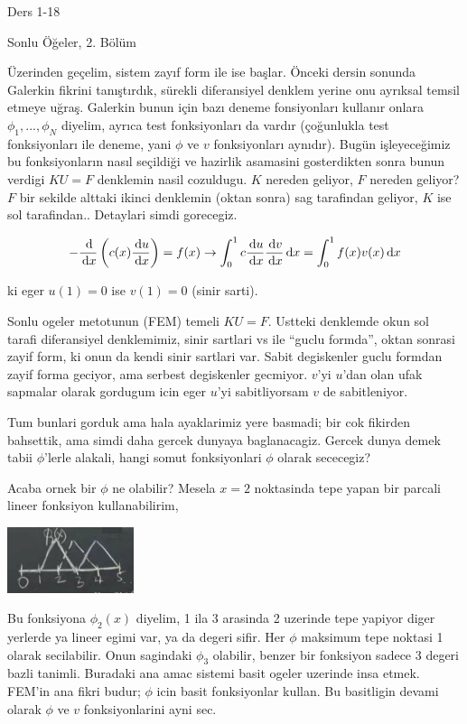\documentclass[12pt,fleqn]{article}\usepackage{../../common}
\begin{document}
Ders 1-18

Sonlu Öğeler, 2. Bölüm

Üzerinden geçelim, sistem zayıf form ile ise başlar. Önceki dersin sonunda
Galerkin fikrini tanıştırdık, sürekli diferansiyel denklem yerine onu ayrıksal
temsil etmeye uğraş. Galerkin bunun için bazı deneme fonsiyonları kullanır
onlara $\phi_1,...,\phi_N$ diyelim, ayrıca test fonksiyonları da vardır
(çoğunlukla test fonksiyonları ile deneme, yani $\phi$ ve $v$ fonksiyonları
aynıdır). Bugün işleyeceğimiz bu fonksiyonların nasıl seçildiği ve hazirlik
asamasini gosterdikten sonra bunun verdigi $KU = F$ denklemin nasil
cozuldugu. $K$ nereden geliyor, $F$ nereden geliyor? $F$ bir sekilde alttaki
ikinci denklemin (oktan sonra) sag tarafindan geliyor, $K$ ise sol
tarafindan.. Detaylari simdi gorecegiz.

$$
- \frac{\,\mathrm{d}}{\,\mathrm{d} x} \left( c(x) \frac{\,\mathrm{d} u}{\,\mathrm{d} x} \right) = f(x) \to
\int _{0}^{1} c \frac{\,\mathrm{d} u}{\,\mathrm{d} x} \frac{\,\mathrm{d} v}{\,\mathrm{d} x} \,\mathrm{d} x =
\int _{0}^{1} f(x) v(x) \,\mathrm{d} x
$$

ki eger $u(1)=0$ ise $v(1) = 0$ (sinir sarti).

Sonlu ogeler metotunun (FEM) temeli $KU = F$. Ustteki denklemde okun sol tarafi
diferansiyel denklemimiz, sinir sartlari vs ile ``guclu formda'', oktan sonrasi
zayif form, ki onun da kendi sinir sartlari var. Sabit degiskenler guclu formdan
zayif forma geciyor, ama serbest degiskenler gecmiyor. $v$'yi $u$'dan olan ufak
sapmalar olarak gordugum icin eger $u$'yi sabitliyorsam $v$ de sabitleniyor.

Tum bunlari gorduk ama hala ayaklarimiz yere basmadi; bir cok fikirden
bahsettik, ama simdi daha gercek dunyaya baglanacagiz. Gercek dunya demek tabii
$\phi$'lerle alakali, hangi somut fonksiyonlari $\phi$ olarak sececegiz?

Acaba ornek bir $\phi$ ne olabilir? Mesela $x=2$ noktasinda tepe yapan bir
parcali lineer fonksiyon kullanabilirim,

\includegraphics[width=10em]{compscieng_1_18_01.png}

Bu fonksiyona $\phi_2(x)$ diyelim, 1 ila 3 arasinda 2 uzerinde tepe yapiyor
diger yerlerde ya lineer egimi var, ya da degeri sifir. Her $\phi$ maksimum tepe
noktasi 1 olarak secilabilir. Onun sagindaki $\phi_3$ olabilir, benzer bir
fonksiyon sadece 3 degeri bazli tanimli. Buradaki ana amac sistemi basit ogeler
uzerinde insa etmek. FEM'in ana fikri budur; $\phi$ icin basit fonksiyonlar
kullan. Bu basitligin devami olarak $\phi$ ve $v$ fonksiyonlarini ayni sec.
\end{document}
